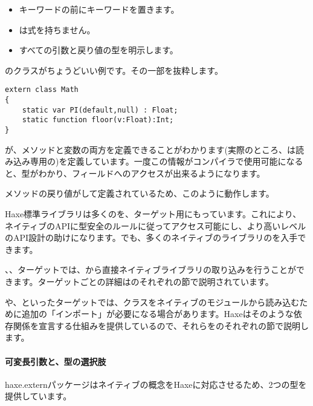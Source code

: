 \begin{itemize}
	\item {}キーワードの前にキーワードを置きます。
	\item {}は式を持ちません。
	\item すべての引数と戻り値の型を明示します。
\end{itemize}

のクラスがちょうどいい例です。その一部を抜粋します。

\begin{lstlisting}
extern class Math
{
	static var PI(default,null) : Float;
	static function floor(v:Float):Int;
}
\end{lstlisting}

が、メソッドと変数の両方を定義できることがわかります(実際のところ、は読み込み専用の)を定義しています。一度この情報がコンパイラで使用可能になると、型がわかり、フィールドへのアクセスが出来るようになります。


メソッドの戻り値がして定義されているため、このように動作します。

Haxe標準ライブラリは多くのを、ターゲット用にもっています。これにより、ネイティブのAPIに型安全のルールに従ってアクセス可能にし、より高いレベルのAPI設計の助けになります。でも、多くのネイティブのライブラリのを入手できます。

、、ターゲットでは、から直接ネイティブライブラリの取り込みを行うことができます。ターゲットごとの詳細はのそれぞれの節で説明されています。

や、といったターゲットでは、クラスをネイティブのモジュールから読み込むために追加の「インポート」が必要になる場合があります。Haxeはそのような依存関係を宣言する仕組みを提供しているので、それらをのそれぞれの節で説明します。

\paragraph{可変長引数と、型の選択肢}

haxe.externパッケージはネイティブの概念をHaxeに対応させるため、2つの型を提供しています。

